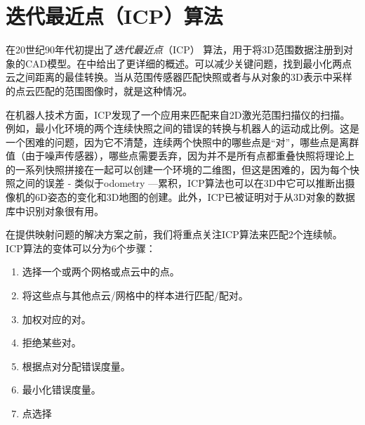 
\section {迭代最近点（ICP）算法}
在20世纪90年代初提出了\emph{迭代最近点}（ICP） 算法，用于将3D范围数据注册到对象的CAD模型。在\cite{rusinkiewicz01}中给出了更详细的概述。可以减少关键问题，找到最小化两点云之间距离的最佳转换。当从范围传感器匹配快照或者与从对象的3D表示中采样的点云匹配的范围图像时，就是这种情况。

在机器人技术方面，ICP发现了一个应用来匹配来自2D激光范围扫描仪的扫描。例如，最小化环境的两个连续快照之间的错误的转换与机器人的运动成比例。这是一个困难的问题，因为它不清楚，连续两个快照中的哪些点是“对”，哪些点是离群值（由于噪声传感器），哪些点需要丢弃，因为并不是所有点都重叠快照将理论上的一系列快照拼接在一起可以创建一个环境的二维图，但这是困难的，因为每个快照之间的误差 - 类似于odometry ---累积，ICP算法也可以在3D中它可以推断出摄像机的6D姿态的变化和3D地图的创建。此外，ICP已被证明对于从3D对象的数据库中识别对象很有用。

在提供映射问题的解决方案之前，我们将重点关注ICP算法来匹配2个连续帧。 ICP算法的变体可以分为6个步骤：

\begin{enumerate}

\item 选择一个或两个网格或点云中的点。
\item 将这些点与其他点云/网格中的样本进行匹配/配对。
\item 加权对应的对。
\item 拒绝某些对。
\item 根据点对分配错误度量。
\item 最小化错误度量。
\item 点选择
\end{enumerate}

